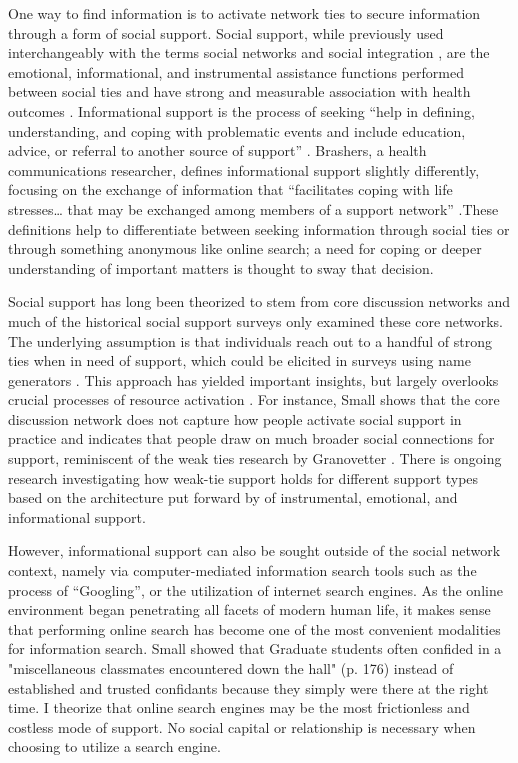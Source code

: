 One way to find information is to activate network ties to secure information
through a form of social support. Social support, while previously used
interchangeably with the terms social networks and social integration
\citep{houseStructuresProcessesSocial1988}, are the emotional, informational, and
instrumental assistance functions performed between social ties and have strong
and measurable association with health outcomes
\citep{houseMeasuresConceptsSocial1985, thoitsMechanismsLinkingSocial2011}.
Informational support is the process of seeking “help in defining,
understanding, and coping with problematic events and include education, advice,
or referral to another source of support” \citep[][p. 640]{winemiller_etal93}.
Brashers, a health communications researcher, defines informational support
slightly differently, focusing on the exchange of information that “facilitates
coping with life stresses… that may be exchanged among members of a support
network” \citet[][p. 260]{brashersInformationSeekingAvoiding2002}.These definitions
help to differentiate between seeking information through social ties or through
something anonymous like online search; a need for coping or deeper
understanding of important matters is thought to sway that decision.

Social support has long been theorized to stem from core discussion networks and
much of the historical social support surveys only examined these core
networks. The underlying assumption is that individuals reach out to a handful
of strong ties when in need of support, which could be elicited in surveys using
name generators \citep{marsdenCoreDiscussionNetworks1987}. This approach has yielded
important insights, but largely overlooks crucial
processes of resource activation \citep{hurlbertCoreNetworksTie2000,
perrySocialNetworkActivation2015, smithDonPutMy2005}. For instance, Small
\citet{smallSomeoneTalk2017} shows that the core discussion network does not capture
how people activate social support in practice and indicates that people draw on
much broader social connections for support, reminiscent of the weak ties
research by Granovetter \citet{granovetterStrengthWeakTies1973}. There is ongoing
research investigating how weak-tie support holds for different support types
based on the architecture put forward by 
\citet{houseStructuresProcessesSocial1988} of instrumental, emotional, and
informational support. 

However, informational support can also be sought outside of the social network
context, namely via computer-mediated information search tools such as the
process of “Googling”, or the utilization of internet search engines. 
As the online environment began penetrating all facets of
modern human life, it makes sense that performing online search has become one
of the most convenient modalities for information search. Small
\citet{smallSomeoneTalk2017} showed that Graduate students often
confided in a "miscellaneous classmates encountered down the hall" (p.
176) instead of established and trusted confidants because they
simply were there at the right time. I theorize that online search engines
may be the most frictionless and costless mode of support. 
No social capital or relationship is necessary when choosing to utilize a search engine. 

